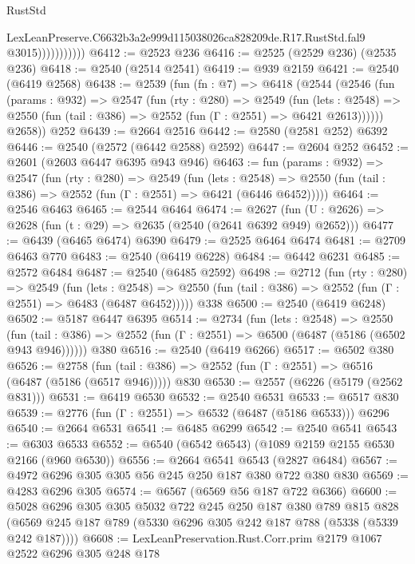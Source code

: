 \begin{lexlean}{RustStd}
\begin{coremodule}
                          LexLeanPreserve.C6632b3a2e999d115038026ca828209de.R17.RustStd.fal9
                          @3015)))))))))))
@6412 := @2523 @236
@6416 := @2525 (@2529 @236) (@2535 @236)
@6418 := @2540 (@2514 @2541)
@6419 := @939 @2159
@6421 := @2540 (@6419 @2568)
@6438 := @2539
    (fun (fn : @7) =>
    @6418
      (@2544
        (@2546
          (fun (params : @932) =>
          @2547
            (fun (rty : @280) =>
            @2549
              (fun (lets : @2548) =>
              @2550 (fun (tail : @386) => @2552 (fun (Γ : @2551) => @6421 @2613))))))
        @2658))
    @252
@6439 := @2664 @2516
@6442 := @2580 (@2581 @252) @6392
@6446 := @2540 (@2572 (@6442 @2588) @2592)
@6447 := @2604 @252
@6452 := @2601 (@2603 @6447 @6395 @943 @946)
@6463 := fun (params : @932) =>
  @2547
    (fun (rty : @280) =>
    @2549
      (fun (lets : @2548) =>
      @2550 (fun (tail : @386) => @2552 (fun (Γ : @2551) => @6421 (@6446 @6452)))))
@6464 := @2546 @6463
@6465 := @2544 @6464
@6474 := @2627 (fun (U : @2626) => @2628 (fun (t : @29) => @2635 (@2540 (@2641 @6392 @949) @2652)))
@6477 := @6439 (@6465 @6474) @6390
@6479 := @2525 @6464 @6474
@6481 := @2709 @6463 @770
@6483 := @2540 (@6419 @6228)
@6484 := @6442 @6231
@6485 := @2572 @6484
@6487 := @2540 (@6485 @2592)
@6498 := @2712
    (fun (rty : @280) =>
    @2549
      (fun (lets : @2548) =>
      @2550 (fun (tail : @386) => @2552 (fun (Γ : @2551) => @6483 (@6487 @6452)))))
    @338
@6500 := @2540 (@6419 @6248)
@6502 := @5187 @6447 @6395
@6514 := @2734
    (fun (lets : @2548) =>
    @2550 (fun (tail : @386) => @2552 (fun (Γ : @2551) => @6500 (@6487 (@5186 (@6502 @943 @946))))))
    @380
@6516 := @2540 (@6419 @6266)
@6517 := @6502 @380
@6526 := @2758
    (fun (tail : @386) => @2552 (fun (Γ : @2551) => @6516 (@6487 (@5186 (@6517 @946)))))
    @830
@6530 := @2557 (@6226 (@5179 (@2562 @831)))
@6531 := @6419 @6530
@6532 := @2540 @6531
@6533 := @6517 @830
@6539 := @2776 (fun (Γ : @2551) => @6532 (@6487 (@5186 @6533))) @6296
@6540 := @2664 @6531
@6541 := @6485 @6299
@6542 := @2540 @6541
@6543 := @6303 @6533
@6552 := @6540 (@6542 @6543) (@1089 @2159 @2155 @6530 @2166 (@960 @6530))
@6556 := @2664 @6541 @6543 (@2827 @6484)
@6567 := @4972 @6296 @305 @305 @56 @245 @250 @187 @380 @722 @380 @830
@6569 := @4283 @6296 @305
@6574 := @6567 (@6569 @56 @187 @722 @6366)
@6600 := @5028
    @6296
    @305
    @305
    @5032
    @722
    @245
    @250
    @187
    @380
    @789
    @815
    @828
    (@6569 @245 @187 @789 (@5330 @6296 @305 @242 @187 @788 (@5338 (@5339 @242 @187))))
@6608 := LexLeanPreservation.Rust.Corr.prim @2179 @1067 @2522 @6296 @305 @248 @178

\end{coremodule}
\end{lexlean}

